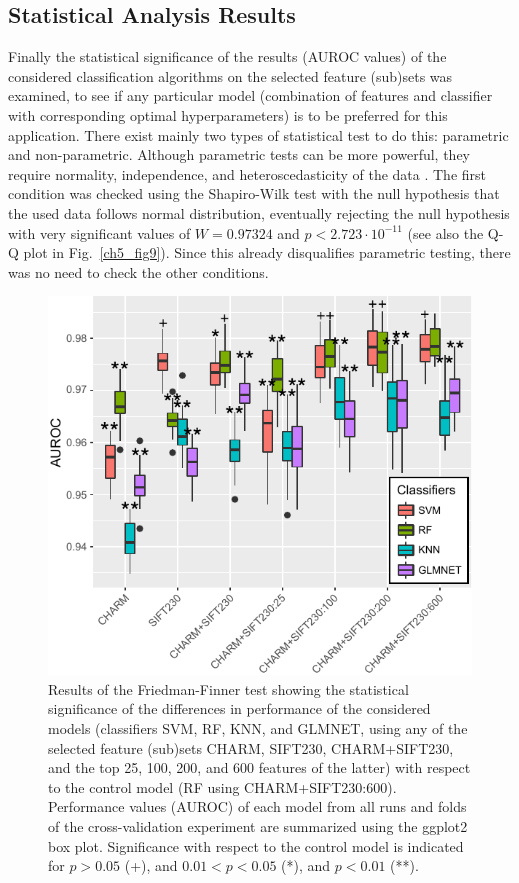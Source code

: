 \subsection{Statistical Analysis Results}
\label{subsec:experimentalAnalysis}
Finally the statistical significance of the results (AUROC values) of the considered classification algorithms on the selected feature (sub)sets was examined, to see if any particular model (combination of features and classifier with corresponding optimal hyperparameters) is to be preferred for this application. There exist mainly two types of statistical test to do this: parametric and non-parametric. Although parametric tests can be more powerful, they require normality, independence, and heteroscedasticity of the data \cite{fernandez2016methodology}. The first condition was checked using the Shapiro-Wilk test \cite{shapiro1965analysis} with the null hypothesis that the used data follows normal distribution, eventually rejecting the null hypothesis with very significant values of $W = 0.97324$ and $p < 2.723 \cdot 10^{-11}$ (see also the Q-Q plot in Fig.~\ref{ch5_fig9}). Since this already disqualifies parametric testing, there was no need to check the other conditions.
\begin{figure}[h!]
	\centering
	\includegraphics[width=0.65\columnwidth]{fig10}
	\caption{Results of the Friedman-Finner test showing the statistical significance of the differences in performance of the considered models (classifiers SVM, RF, KNN, and GLMNET, using any of the selected feature (sub)sets CHARM, SIFT230, CHARM+SIFT230, and the top 25, 100, 200, and 600 features of the latter) with respect to the control model (RF using CHARM+SIFT230:600). Performance values (AUROC) of each model from all runs and folds of the cross-validation experiment are summarized using the ggplot2 box plot. Significance with respect to the control model is indicated for $p > 0.05$ (+), and $0.01 < p < 0.05$ (*), and $p < 0.01$ (**).}
	\label{ch5_fig10}
\end{figure}

